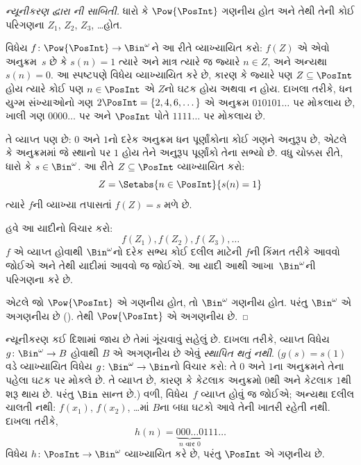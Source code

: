 \begin{proof}[ન્યૂનીકરણ દ્વારા {}ની સાબિતી]
ધારો કે $\Pow{\PosInt}$ ગણનીય હોત અને તેથી તેની કોઈ
પરિગણના $Z_{1}$, $Z_{2}$, $Z_{3}$, \dots હોત.

વિધેય $f \colon \Pow{\PosInt} \to \Bin^\omega$ને આ રીતે
વ્યાખ્યાયિત કરો: $f(Z)$ એ એવો અનુક્રમ~$s$ છે કે
$s(n) = 1$ ત્યારે અને માત્ર ત્યારે જ જ્યારે $n \in Z$, અને
અન્યથા $s(n) = 0$. આ સ્પષ્ટપણે વિધેય વ્યાખ્યાયિત કરે છે,
કારણ કે જ્યારે પણ $Z \subseteq \PosInt$ હોય ત્યારે કોઈ પણ
$n \in \PosInt$ એ $Z$નો ઘટક હોય અથવા ન હોય.
દાખલા તરીકે, ધન યુગ્મ સંખ્યાઓનો ગણ $2\PosInt = \{2,
4, 6, \dots\}$ એ અનુક્રમ $010101\dots$ પર મોકલાય છે,
ખાલી ગણ $0000\dots$ પર અને $\PosInt$ પોતે $1111\dots$ પર મોકલાય છે.

તે વ્યાપ્ત પણ છે: $0$ અને $1$નો દરેક અનુક્રમ ધન
પૂર્ણાંકોના કોઈ ગણને અનુરૂપ છે, એટલે કે અનુક્રમમાં જે સ્થાનો પર
$1$ હોય તેને અનુરૂપ પૂર્ણાંકો તેના સભ્યો છે. વધુ ચોક્કસ રીતે,
ધારો કે $s \in \Bin^\omega$. આ રીતે $Z \subseteq \PosInt$
વ્યાખ્યાયિત કરો:
\[
Z = \Setabs{n \in \PosInt}{s(n) = 1}
\]
ત્યારે $f$ની વ્યાખ્યા તપાસતાં $f(Z) = s$ મળે છે.

હવે આ યાદીનો વિચાર કરો:
\[
f(Z_1), f(Z_2), f(Z_3), \dots
\]
$f$ એ વ્યાપ્ત હોવાથી $\Bin^\omega$નો દરેક સભ્ય કોઈ
દલીલ માટેની $f$ની કિંમત તરીકે આવવો જોઈએ અને તેથી યાદીમાં આવવો જ
જોઈએ. આ યાદી આથી આખા~$\Bin^\omega$ની પરિગણના કરે છે.

એટલે જો $\Pow{\PosInt}$ એ ગણનીય હોત, તો $\Bin^\omega$
ગણનીય હોત. પરંતુ $\Bin^\omega$ એ અગણનીય છે
(). તેથી $\Pow{\PosInt}$ એ
અગણનીય છે.
\end{proof}

\begin{explain}
ન્યૂનીકરણ કઈ દિશામાં જાય છે તેમાં ગૂંચવાવું સહેલું છે.
દાખલા તરીકે, વ્યાપ્ત વિધેય $g \colon \Bin^\omega \to B$
હોવાથી $B$ એ અગણનીય છે એવું \emph{સ્થાપિત થતું નથી}.
($g(s) = s(1)$ વડે વ્યાખ્યાયિત વિધેય
$g \colon \Bin^\omega \to \Bin$નો વિચાર કરો: તે $0$ અને $1$ના
અનુક્રમને તેના પહેલા ઘટક પર મોકલે છે. તે વ્યાપ્ત છે,
કારણ કે કેટલાક અનુક્રમો $0$થી અને કેટલાક $1$થી શરૂ થાય છે.
પરંતુ $\Bin$ સાન્ત છે.) વળી, વિધેય~$f$ વ્યાપ્ત હોવું જ
જોઈએ; અન્યથા દલીલ ચાલતી નથી: $f(x_1)$, $f(x_2)$, \dots{}માં
$B$ના બધા ઘટકો આવે તેની ખાતરી રહેતી નથી. દાખલા તરીકે,
\[
h(n) = \underbrace{000\dots0}_{\text{$n$ વાર $0$}}111\dots
\]
વિધેય $h\colon \PosInt \to \Bin^\omega$ વ્યાખ્યાયિત કરે છે,
પરંતુ $\PosInt$ એ ગણનીય છે.
\end{explain}

